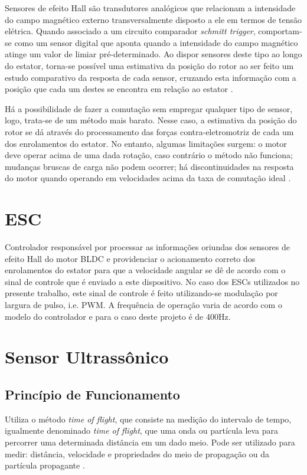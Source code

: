 Sensores de efeito Hall são transdutores analógicos que relacionam a intensidade do campo magnético externo transversalmente disposto a ele em termos 
de tensão elétrica. Quando associado a um circuito comparador \textit{schmitt trigger}, comportam-se como um sensor digital que aponta quando a 
intensidade do campo magnético atinge um valor de limiar pré-determinado. Ao dispor sensores deste tipo ao longo do estator, torna-se possível uma 
estimativa da posição do rotor ao ser feito um estudo comparativo da resposta de cada sensor, cruzando esta informação com a posição que 
cada um destes se encontra em relação ao estator \cite{motor_1}.

Há a possibilidade de fazer a comutação sem empregar qualquer tipo de sensor, logo, trata-se de um método mais barato. 
Nesse caso, a estimativa da posição do rotor se dá através do processamento das forças contra-eletromotriz de cada um dos enrolamentos do estator.
No entanto, algumas limitações surgem: o motor deve operar acima de uma dada rotação, caso contrário o método não funciona; mudanças bruscas de carga 
não podem ocorrer; há discontinuidades na resposta do motor quando operando em velocidades acima da taxa de comutação ideal \cite{motor_1}.

\section{ESC}
Controlador responsável por processar as informações oriundas dos sensores de efeito Hall do motor BLDC e providenciar o acionamento correto 
dos enrolamentos do estator para que a velocidade angular se dê de acordo com o sinal de controle que é enviado a este dispositivo.
No caso dos ESCs utilizados no presente trabalho, este sinal de controle é feito utilizando-se modulação por largura de pulso, i.e. PWM. 
A frequência de operação varia de acordo com o modelo do controlador e para o caso deste projeto é de 400Hz.
\section{Sensor Ultrassônico}

\subsection{Princípio de Funcionamento}
Utiliza o método \textit{time of flight}, que consiste na medição do intervalo de tempo, igualmente denominado \textit{time of flight}, que uma onda 
ou partícula leva para percorrer uma determinada distância em um dado meio. 
Pode ser utilizado para medir: distância, velocidade \cite{TOF_velocity}e propriedades do meio de propagação ou da partícula propagante
\cite{TOF_medium1,TOF_medium2}.

